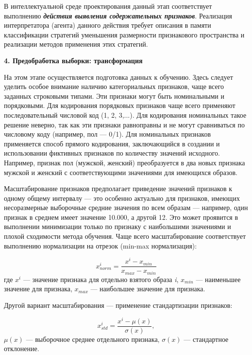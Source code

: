 В интеллектуальной среде проектирования данный этап соответствует выполнению \textbf{\textit{действия выявления содержательных признаков}}. Реализация интерпретатора (агента) данного действия требует описания в памяти классификации стратегий уменьшения размерности признакового пространства и реализации методов применения этих стратегий.


\textbf{4. Предобработка выборки: трансформация}

На этом этапе осуществляется подготовка данных к обучению.
Здесь следует уделить особое внимание наличию категориальных признаков, чаще всего заданных строковыми типами. Эти признаки могут быть номинальными и порядковыми. Для кодирования порядковых признаков чаще всего применяют последовательный числовой код (1, 2, 3,...). Для кодирования номинальных такое решение неверно, так как эти признаки равноправны и не могут сравниваться по числовому коду (например, пол --- 0/1). Для номинальных признаков применяется способ прямого кодирования, заключающийся в создании и использовании фиктивных признаков по количеству значений исходного. Например, признак пол (мужской, женский) преобразуется в два новых признака мужской и женский с соответствующими значениями для имеющихся образов.

Масштабирование признаков предполагает приведение значений признаков к одному общему интервалу --- это особенно актуально для признаков, имеющих несоразмерные выборочные средние значения по всем образам --- например, один признак в среднем имеет значение 10.000, а другой 12. Это может проявится в выполнении минимизации только по признаку с наибольшими значениями и плохой сходимости метода обучения. Чаще всего масштабирование соответствует выполнению нормализации на отрезок (min-max нормализация):

\begin{equation*}
	x_{norm}^i = \frac{x^i - x_{min}}{x_{max} - x_{min}}
\end{equation*}
где $x^i$ --- значение признака для отдельно взятого образа \textit{i}, $x_{min}$ --- наименьшее значение для признака, $x_{max}$ --- наибольшее значение для признака.

Другой вариант масштабирования --- применение стандартизации признаков:

\begin{equation*}
	x_{std}^i = \frac{x^i - \mu(x)}{\sigma(x)},
\end{equation*}
$\mu(x)$ --- выборочное среднее отдельного признака, $\sigma(x)$ --- стандартное отклонение.

